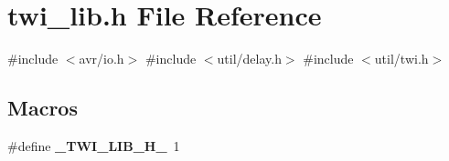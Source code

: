 \section{twi\+\_\+lib.\+h File Reference}
\label{twi__lib_8h}
{\ttfamily \#include $<$avr/io.\+h$>$}\newline
{\ttfamily \#include $<$util/delay.\+h$>$}\newline
{\ttfamily \#include $<$util/twi.\+h$>$}\newline
\subsection*{Macros}
\begin{DoxyCompactItemize}
\item 
\#define \textbf{ \+\_\+\+T\+W\+I\+\_\+\+L\+I\+B\+\_\+\+H\+\_\+}~1
\end{DoxyCompactItemize}
